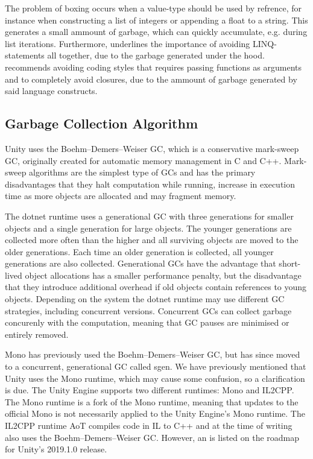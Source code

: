 The problem of boxing occurs when a value-type should be used by refrence, for instance when constructing a list of integers or appending a float to a string. This generates a small ammount of garbage, which can quickly accumulate, e.g. during list iterations. Furthermore, \cite{unity:optimisation} underlines the importance of avoiding \gls{LINQ}-statements all together, due to the garbage generated under the hood. \cite{unity:heap} recommends avoiding coding styles that requires passing functions as arguments and to completely avoid closures, due to the ammount of garbage generated by said language constructs.

\subsection{Garbage Collection Algorithm}
Unity uses the Boehm–Demers–Weiser \gls{GC}, which is a conservative mark-sweep \gls{GC}\cite{unity:heap}, originally created for automatic memory management in C and C++\cite{boehm2007transparent}. Mark-sweep algorithms are the simplest type of \glspl{GC} and has the primary disadvantages that they halt computation while running, increase in execution time as more objects are allocated and may fragment memory\cite{sestoft2017programming}.

The dotnet runtime uses a generational \gls{GC} with three generations for smaller objects and a single generation for large objects\cite{dotnet:gc}. The younger generations are collected more often than the higher and all surviving objects are moved to the older generations. Each time an older generation is collected, all younger generations are also collected. Generational \glspl{GC} have the advantage that short-lived object allocations has a smaller performance penalty, but the disadvantage that they introduce additional overhead if old objects contain references to young objects\cite{sestoft2017programming}. Depending on the system the dotnet runtime may use different \gls{GC} strategies, including concurrent versions\cite{dotnet:gc}. Concurrent \glspl{GC} can collect garbage concurenly with the computation, meaning that \gls{GC} pauses are minimised or entirely removed\cite{dotnet:gc}.

Mono has previously used the Boehm–Demers–Weiser \gls{GC}, but has since moved to a concurrent, generational \gls{GC} called sgen\cite{mono:gc}. We have previously mentioned that Unity uses the Mono runtime, which may cause some confusion, so a clarification is due. The Unity Engine supports two different runtimes: Mono and IL2CPP. The Mono runtime is a fork of the Mono runtime\cite{unity:mono:github}, meaning that updates to the official Mono is not necessarily applied to the Unity Engine's Mono runtime. The IL2CPP runtime \gls{AoT} compiles code in \gls{IL} to C++ and at the time of writing also uses the Boehm–Demers–Weiser \gls{GC}\cite{il2cpp:gc}. However, an \textit{} is listed on the roadmap for Unity's 2019.1.0 release\cite{unity:roadmap}.

